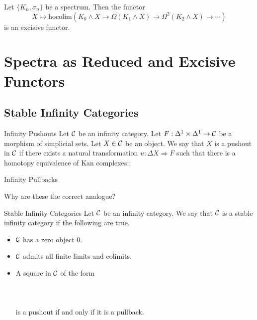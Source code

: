 \documentclass[a4paper]{article}
\begin{document}
\begin{thm}{}{} Let $\{K_n,\sigma_n\}$ be a spectrum. Then the functor $$X\mapsto\text{hocolim}(K_0\wedge X\rightarrow\Omega(K_1\wedge X)\rightarrow\Omega^2(K_2\wedge X)\rightarrow\cdots)$$ is an excisive functor. 
\end{thm}

\pagebreak
\section{Spectra as Reduced and Excisive Functors}
\subsection{Stable Infinity Categories}
\begin{defn}{Infinity Pushouts}{} Let $\mathcal{C}$ be an infinity category. Let $F:\Delta^1\times\Delta^1\to\mathcal{C}$ be a morphism of simplicial sets. Let $X\in\mathcal{C}$ be an object. We say that $X$ is a pushout in $\mathcal{C}$ if there exists a natural transformation $u:\Delta X\Rightarrow F$ such that there is a homotopy equivalence of Kan complexes: 
\end{defn}

\begin{defn}{Infinity Pullbacks}{}
\end{defn}

Why are these the correct analogue? \\

\begin{defn}{Stable Infinity Categories}{} Let $\mathcal{C}$ be an infinity category. We say that $\mathcal{C}$ is a stable infinity category if the following are true. 
\begin{itemize}
\item $\mathcal{C}$ has a zero object $0$. 
\item $\mathcal{C}$ admits all finite limits and colimits. 
\item A square in $\mathcal{C}$ of the form \\~\\
\\~\\
is a pushout if and only if it is a pullback. 
\end{itemize}
\end{defn}
\end{document}
